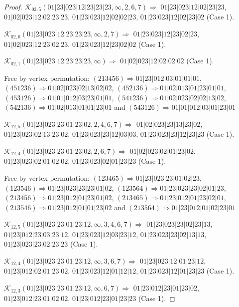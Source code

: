 \documentclass[12pt]{article}
\theoremstyle{plain}
\theoremstyle{definition}
\theoremstyle{remark}
\newcommand{\fancy}[1]{\mathcal{#1}}
\def\K{\fancy{K}}
\begin{document}
\begin{proof}
	$\K_{02,5}(01|23|023|12|23|23|23,\infty,2, 6, 7)\Rightarrow $ $01|23|023|12|02|23|23$, $01|02|023|12|02|23|23$, $01|23|023|12|02|02|23$, $01|23|023|12|02|23|02$ (Case 1).
	
	$\K_{02,6}(01|23|023|12|23|23|23,\infty,2, 7)\Rightarrow $ $01|23|023|12|23|02|23$, $01|02|023|12|23|02|23$, $01|23|023|12|23|02|02$ (Case 1).
	
	$\K_{02,1}(01|23|023|12|23|23|23,\infty)\Rightarrow $ $01|02|023|12|02|02|02$ (Case 1).
	
	
	
	Free by vertex permutation: $(2 1 3 4 5 6)\Rightarrow 01|23|012|03|01|01|01$, $(4 5 1 2 3 6)\Rightarrow 01|02|023|02|13|02|02$, $(4 5 2 1 3 6)\Rightarrow 01|02|013|01|23|01|01$, $(4 5 3 1 2 6)\Rightarrow 01|01|012|03|23|01|01$, $(5 4 1 2 3 6)\Rightarrow 01|02|023|02|02|13|02$, $(5 4 2 1 3 6)\Rightarrow 01|02|013|01|01|23|01$ and $(5 4 3 1 2 6)\Rightarrow 01|01|012|03|01|23|01$
	
	
	
	\bigskip
	
	$\K_{12,5}(01|23|023|23|01|23|02,2, 4, 6, 7)\Rightarrow $ $01|02|023|23|13|23|02$, $01|23|023|02|13|23|02$, $01|23|023|23|12|03|03$, $01|23|023|23|12|23|23$ (Case 1).
	
	$\K_{12,4}(01|23|023|23|01|23|02,2, 6, 7)\Rightarrow $ $01|02|023|02|01|23|02$, $01|23|023|02|01|02|02$, $01|23|023|02|01|23|23$ (Case 1).
	
	
	
	Free by vertex permutation: $(1 2 3 4 6 5)\Rightarrow 01|23|023|23|01|02|23$, $(1 2 3 5 4 6)\Rightarrow 01|23|023|23|23|01|02$, $(1 2 3 5 6 4)\Rightarrow 01|23|023|23|02|01|23$, $(2 1 3 4 5 6)\Rightarrow 01|23|012|01|23|01|02$, $(2 1 3 4 6 5)\Rightarrow 01|23|012|01|23|02|01$, $(2 1 3 5 4 6)\Rightarrow 01|23|012|01|01|23|02$ and $(2 1 3 5 6 4)\Rightarrow 01|23|012|01|02|23|01$
	
	
	
	\bigskip
	
	$\K_{12,5}(01|23|023|23|01|23|12,\infty,3, 4, 6, 7)\Rightarrow $ $01|23|023|23|02|23|13$, $01|23|012|23|03|23|12$, $01|23|023|12|03|23|12$, $01|23|023|23|02|13|13$, $01|23|023|23|02|23|23$ (Case 1).
	
	$\K_{12,4}(01|23|023|23|01|23|12,\infty,3, 6, 7)\Rightarrow $ $01|23|023|12|01|23|12$, $01|23|012|02|01|23|02$, $01|23|023|12|01|12|12$, $01|23|023|12|01|23|23$ (Case 1).
	
	$\K_{12,3}(01|23|023|23|01|23|12,\infty,6, 7)\Rightarrow $ $01|23|012|23|01|23|02$, $01|23|012|23|01|02|02$, $01|23|012|23|01|23|23$ (Case 1).
	

\end{proof}
\end{document}

